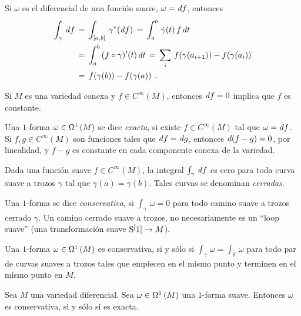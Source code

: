 \begin{obsIntegrarFormasExactas}\label{obs:integrarformasexactas}
	Si $\omega$ es el diferencial de una funci\'{o}n suave,
	$\omega=\derext{f}$, entonces
	\begin{align*}
		\int_{\gamma}\,\derext{f} & \,=\,\int_{[a,b]}\,
			\pull{\gamma}(\derext{f}) \,=\,
			\int_{a}^{b}\,\dot{\gamma}(t)\,f\,dt \\
		& \,=\,\int_{a}^{b}\,(f\circ\gamma)'(t)\,dt \,=\,
			\sum_{i}\,f(\gamma(a_{i+1}))-f(\gamma(a_{i})) \\
		& \,=\,f(\gamma(b))-f(\gamma(a))
		\text{ .}
	\end{align*}
\end{obsIntegrarFormasExactas}

\begin{obsDiferencialCeroConstante}\label{obs:diferencialceroconstante}
	Si $M$ es una variedad conexa y $f\in C^{\infty}(M)$,
	entonces $\derext{f}=0$ implica que $f$ es constante.
\end{obsDiferencialCeroConstante}

Una $1$-forma $\omega\in\formes[1]{M}$ se dice \emph{exacta}, si existe
$f\in C^{\infty}(M)$ tal que $\omega=\derext{f}$. Si $f,g\in C^{\infty}(M)$
son funciones tales que $\derext{f}=\derext{g}$, entonces $\derext{(f-g)}=0$,
por linealidad, y $f-g$ es constante en cada componente conexa de la variedad.

\begin{obsIntegrarExactasEnCaminosCerrados}%
	\label{obs:integrarexactasencaminoscerrados}
	Dada una funci\'{o}n suave $f\in C^{\infty}(M)$, la integral
	$\int_{\gamma}\,\derext{f}$ es cero para toda curva suave a trozos
	$\gamma$ tal que $\gamma(a)=\gamma(b)$. Tales curvas se denominan
	\emph{cerradas}.
\end{obsIntegrarExactasEnCaminosCerrados}

Una $1$-forma se dice \emph{conservativa}, si $\int_{\gamma}\,\omega=0$ para
todo camino suave a trozos cerrado $\gamma$. Un camino cerrado suave a trozos,
no necesariamente es un ``loop suave'' (una transformaci\'{o}n suave
$\esfera[1]\rightarrow M$).

\begin{obsConservativaSiiIntegralIndependienteDelCamino}%
	\label{obs:conservativasiiintegralindependientedelcamino}
	Una $1$-forma $\omega\in\formes[1]{M}$ es conservativa, si y
	s\'{o}lo si $\int_{\gamma}\,\omega=\int_{\delta}\,\omega$ para todo
	par de curvas suaves a trozos tales que empiecen en el mismo
	punto y terminen en el mismo punto en $M$.
\end{obsConservativaSiiIntegralIndependienteDelCamino}

\begin{teoUnoFormaConservativaSiiExacta}%
	\label{thm:unoformaconservativasiiexacta}
	Sea $M$ una variedad diferencial. Sea $\omega\in\formes[1]{M}$ una
	$1$-forma suave. Entonces $\omega$ es conservativa, si y s\'{o}lo
	si es exacta.
\end{teoUnoFormaConservativaSiiExacta}

